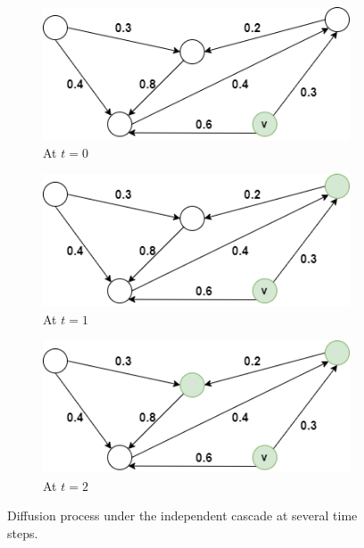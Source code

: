 \begin{figure}[!h]
\centering
\begin{subfigure}{0.3\textwidth}
    \includegraphics[width=\textwidth]{GSSI_thesisProposal/figures/ic1.png}
    \caption{At $t=0$}
    \label{fig:ic1}
\end{subfigure}
\hfill
\begin{subfigure}{0.3\textwidth}
    \includegraphics[width=\textwidth]{GSSI_thesisProposal/figures/ic2.png}
    \caption{At $t=1$}
    \label{fig:ic2}
\end{subfigure}
\hfill
\begin{subfigure}{0.3\textwidth}
    \includegraphics[width=\textwidth]{GSSI_thesisProposal/figures/ic3.png}
    \caption{At $t=2$}
    \label{fig:ic3}
\end{subfigure}
\caption{Diffusion process under the independent cascade at several time steps.}
\label{fig:cascade}
\end{figure}


